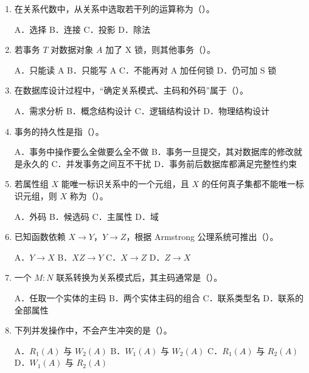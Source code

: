 \documentclass{../../note}
\begin{document}
\begin{enumerate}[itemsep=0.8em]
A．实体完整性 \quad B．参照完整性 \quad C．用户定义完整性 \quad D．视图完整性

\item 在关系代数中，从关系中选取若干列的运算称为（\hspace{0.8cm}）。

A．选择 \quad B．连接 \quad C．投影 \quad D．除法

\item 若事务 $T$ 对数据对象 $A$ 加了 X 锁，则其他事务（\hspace{0.8cm}）。

A．只能读 A \quad B．只能写 A \quad C．不能再对 A 加任何锁 \quad D．仍可加 S 锁

\item 在数据库设计过程中，“确定关系模式、主码和外码”属于（\hspace{0.8cm}）。

A．需求分析 \quad B．概念结构设计 \quad C．逻辑结构设计 \quad D．物理结构设计

\item 事务的持久性是指（\hspace{0.8cm}）。

A．事务中操作要么全做要么全不做
\quad B．事务一旦提交，其对数据库的修改就是永久的
\quad C．并发事务之间互不干扰
\quad D．事务前后数据库都满足完整性约束

\item 若属性组 $X$ 能唯一标识关系中的一个元组，且 $X$ 的任何真子集都不能唯一标识元组，则 $X$ 称为（\hspace{0.8cm}）。

A．外码 \quad B．候选码 \quad C．主属性 \quad D．域

\item 已知函数依赖 $X \rightarrow Y$，$Y \rightarrow Z$，根据 Armstrong 公理系统可推出（\hspace{0.8cm}）。

A．$Y \rightarrow X$ \quad B．$XZ \rightarrow Y$ \quad C．$X \rightarrow Z$ \quad D．$Z \rightarrow X$

\item 一个 $M:N$ 联系转换为关系模式后，其主码通常是（\hspace{0.8cm}）。

A．任取一个实体的主码
\quad B．两个实体主码的组合
\quad C．联系类型名
\quad D．联系的全部属性

\item 下列并发操作中，不会产生冲突的是（\hspace{0.8cm}）。

A．$R_1(A)$ 与 $W_2(A)$ \quad B．$W_1(A)$ 与 $W_2(A)$ \quad C．$R_1(A)$ 与 $R_2(A)$ \quad D．$W_1(A)$ 与 $R_2(A)$
\end{enumerate}
\end{document}
